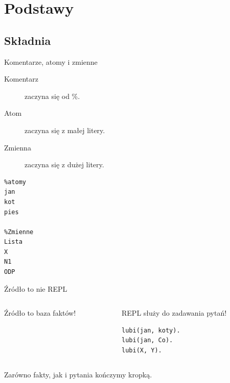 \documentclass[blue]{beamer}
\begin{document}
\section{Podstawy}
\subsection{Składnia}
\begin{frame}[fragile]{Komentarze, atomy i zmienne}
\begin{description}
\item[Komentarz] zaczyna się od \%.
\item[Atom] zaczyna się z małej litery.
\item[Zmienna] zaczyna się z dużej litery.\
\end{description}
\begin{lstlisting}
%atomy
jan
kot
pies

%Zmienne
Lista
X
N1
ODP
\end{lstlisting}
\end{frame}
\begin{frame}[fragile]{Źródło to nie REPL}
\begin{columns}
\begin{column}{.5\linewidth}
Źródło to baza faktów!


\end{column}
\begin{column}{.5\linewidth}
REPL służy do zadawania pytań!

\begin{lstlisting}
lubi(jan, koty).
lubi(jan, Co).
lubi(X, Y).
\end{lstlisting}
\end{column}
\end{columns}
Zarówno fakty, jak i pytania kończymy kropką.
\end{frame}
\end{document}
